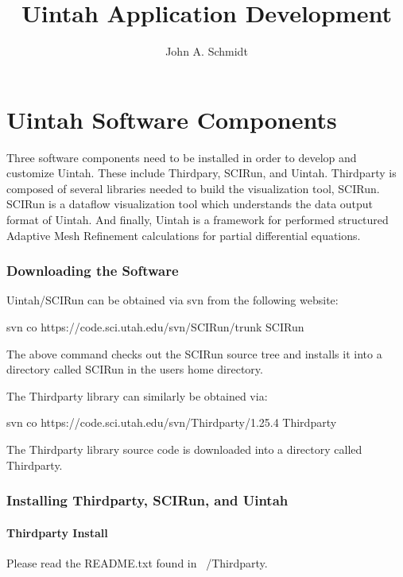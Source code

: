 \documentclass[12pt]{report}
\begin{document}
\title{Uintah Application Development}

\author{John A. Schmidt}

\maketitle


\chapter{Uintah Software Components}

Three software components need to be installed in order to develop and
customize Uintah.  These include Thirdpary, SCIRun, and Uintah.
Thirdparty is composed of several libraries needed to build the
visualization tool, SCIRun.  SCIRun is a dataflow visualization tool
which understands the data output format of Uintah.  And finally,
Uintah is a framework for performed structured Adaptive Mesh
Refinement calculations for partial differential equations.

\subsection{Downloading the Software}

Uintah/SCIRun can be obtained via svn from the following website:

svn co https://code.sci.utah.edu/svn/SCIRun/trunk SCIRun

The above command checks out the SCIRun source tree and installs it
into a directory called SCIRun in the users home directory.

The Thirdparty library can similarly be obtained via:

svn co https://code.sci.utah.edu/svn/Thirdparty/1.25.4 Thirdparty

The Thirdparty library source code is downloaded into a directory
called Thirdparty.

\subsection{Installing Thirdparty, SCIRun, and Uintah}

\subsubsection{Thirdparty Install}


Please read the README.txt found in ~/Thirdparty.
\end{document}
